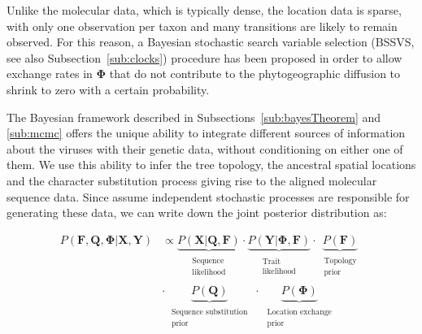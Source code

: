 Unlike the molecular data, which is typically dense, the location data is sparse, with only one observation per taxon and many transitions are likely to remain observed.
For this reason, a Bayesian stochastic search variable selection (BSSVS, see also Subsection~\ref{sub:clocks}) procedure has been proposed in order to allow exchange rates in $\mathbf{\Phi}$ that do not contribute to the phytogeographic diffusion to shrink to zero with a certain probability.

The Bayesian framework described in Subsections~\ref{sub:bayesTheorem} and \ref{sub:mcmc} offers the unique ability to integrate different sources of information about the viruses with their genetic data, without conditioning on either one of them.
We use this ability to infer the tree topology, the ancestral spatial locations and the character substitution process giving rise to the aligned molecular sequence data. 
Since assume independent stochastic processes are responsible for generating these data, we can write down the joint posterior distribution as: 

\begin{align}
P\left(\mathbf{F}, \mathbf{Q}, \mathbf{\Phi}|\mathbf{X},\mathbf{Y}\right) &\propto 
\underbrace{P(\mathbf{X}|\mathbf{Q}, \mathbf{F})}_{\begin{array}{c}
\substack{\text{Sequence} \\ \text{likelihood}}
\end{array}}\cdot\underbrace{P(\mathbf{Y}|\mathbf{\Phi}, \mathbf{F})}_{\begin{array}{c}
\substack{\text{Trait} \\ \text{likelihood}}
\end{array}}\cdot
\underbrace{P(\mathbf{F})}_{\begin{array}{c}
\substack{\text{Topology} \\ \text{prior}}
\end{array}} \nonumber \\
& \cdot \underbrace{P(\mathbf{Q})}_{\begin{array}{c}
\substack{\text{Sequence substitution} \\ \text{prior}}
\end{array}}\cdot\underbrace{P(\mathbf{\Phi})}_{\begin{array}{c}
\substack{\text{Location exchange} \\ \text{prior}}
\end{array}}
\label{eq:posteriorPhylogeography}
\end{align}

